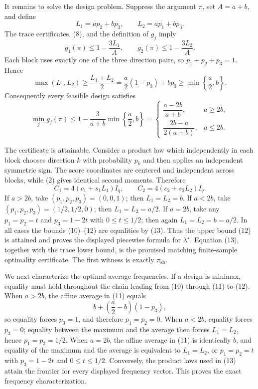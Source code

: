 It remains to solve the design problem. Suppress the argument \(\pi\), set \(A=a+b\), and define
\[
L_1=ap_2+bp_3,\qquad L_2=ap_1+bp_3. \tag{9}
\]
The trace certificates, (8), and the definition of \(g_j\) imply
\[
g_1(\pi)\le 1-\frac{3L_1}{A},
\qquad
g_2(\pi)\le 1-\frac{3L_2}{A}. \tag{10}
\]
Each block uses exactly one of the three direction pairs, so \(p_1+p_2+p_3=1\). Hence
\[
\max(L_1,L_2)
\ge \frac{L_1+L_2}{2}
=\frac a2(1-p_3)+bp_3
\ge \min\left\{\frac a2,b\right\}. \tag{11}
\]
Consequently every feasible design satisfies
\[
\min_j g_j(\pi)
\le 1-\frac{3}{a+b}\min\left\{\frac a2,b\right\}
=
\begin{cases}
\dfrac{a-2b}{a+b},&a\ge 2b,\\[6pt]
\dfrac{2b-a}{2(a+b)},&a\le 2b.
\end{cases} \tag{12}
\]

The certificate is attainable. Consider a product law which independently in each block chooses direction \(k\) with probability \(p_k\) and then applies an independent symmetric sign. The score coordinates are centered and independent across blocks, while (2) gives identical second moments. Therefore
\[
C_1=4(c_1+s_1L_1)I_q,
\qquad
C_2=4(c_2+s_2L_2)I_q. \tag{13}
\]
If \(a>2b\), take \((p_1,p_2,p_3)=(0,0,1)\); then \(L_1=L_2=b\). If \(a<2b\), take \((p_1,p_2,p_3)=(1/2,1/2,0)\); then \(L_1=L_2=a/2\). If \(a=2b\), take any \(p_1=p_2=t\) and \(p_3=1-2t\) with \(0\le t\le 1/2\); then again \(L_1=L_2=b=a/2\). In all cases the bounds (10)--(12) are equalities by (13). Thus the upper bound (12) is attained and proves the displayed piecewise formula for \(\lambda^\star\). Equation (13), together with the trace lower bound, is the promised matching finite-sample optimality certificate. The first witness is exactly \(\pi_{\mathrm{sh}}\).

We next characterize the optimal average frequencies. If a design is minimax, equality must hold throughout the chain leading from (10) through (11) to (12). When \(a>2b\), the affine average in (11) equals
\[
b+\left(\frac a2-b\right)(1-p_3),
\]
so equality forces \(p_3=1\), and therefore \(p_1=p_2=0\). When \(a<2b\), equality forces \(p_3=0\); equality between the maximum and the average then forces \(L_1=L_2\), hence \(p_1=p_2=1/2\). When \(a=2b\), the affine average in (11) is identically \(b\), and equality of the maximum and the average is equivalent to \(L_1=L_2\), or \(p_1=p_2=t\) with \(p_3=1-2t\) and \(0\le t\le 1/2\). Conversely, the product laws used in (13) attain the frontier for every displayed frequency vector. This proves the exact frequency characterization.

